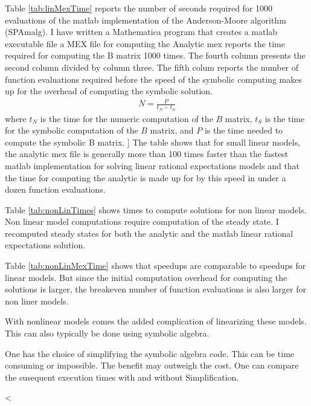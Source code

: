 \documentclass{beamer}
\begin{document}
\begin{frame}
%

Table \ref{tab:linMexTime} reports the number of seconds required for 1000 evaluations of
the matlab implementation of the Anderson-Moore algorithm (SPAmalg).
I have written a Mathematica program that creates a matlab executable file
a MEX file for computing the
Analytic mex reports the time required for computing the B matrix 1000 times.
The fourth column presents  the second column  divided by column three.
The fifth colum reports 
the number of function evaluations required before the speed of the
symbolic computing makes up for the overhead of
computing the symbolic solution.
\begin{gather*}
  N=\frac{P}{t_N-t_S}
\end{gather*}
where $t_N$ is the time for the numeric computation of the $B$ matrix,
$t_S$ is the time for the symbolic computation of the $B$ matrix, and
$P$ is the time needed to compute the symbolic B matrix.
]
The table shows that for small linear models, 
the analytic mex file is generally more than 100 times
faster than the fastest matlab implementation for solving linear rational
expectations models and that the time for computing the analytic is
made up for by this speed in under a dozen function evaluations.


%


Table \ref{tab:nonLinTimes} shows times to compute solutions for non linear
models. Non linear model computations require computation of the steady state.
I recomputed steady states for both the analytic and the matlab linear 
rational expectations solution.



%

Table \ref{tab:nonLinMexTime} shows that
speedups are comparable to speedups for linear models. But since the 
initial computation overhead for computing the solutions is larger, the
breakeven number of function evaluations is also larger for non liner models.

    
With nonlinear models comes the added complication of linearizing these models.
This can also typically be done using symbolic algebra.

One has the choice of simplifying the symbolic algebra code. This can be
time consuming or impossible.  The benefit may outweigh the cost.
One can compare the susequent execution times with and without Simplification.


%
<
    
  \end{frame}
\end{document}

